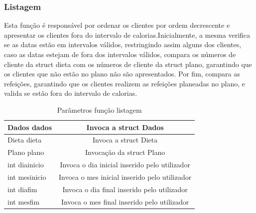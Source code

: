 \documentclass[a4wide]{report}
\begin{document}
\subsubsection{Listagem }
Esta função é responsável por ordenar os clientes por ordem decrescente e apresentar os clientes fora do intervalo de calorias.Inicialmente, a mesma verifica se as datas estão em intervalos válidos, restringindo assim alguns dos clientes, caso as datas estejam de fora dos intervalos válidos, compara os números de cliente da struct dieta com os números de cliente da struct plano, garantindo que os clientes que não estão no plano não são apresentados. Por fim, compara as refeições, garantindo que os clientes realizem as refeições planeadas no plano, e valida se estão fora do intervalo de calorias.
\begin{table}[h]
    \centering
       \caption{Parâmetros função listagem} 
    \begin{tabular}{|l|c|}\hline
         Dados dados&Invoca a struct Dados\\ \hline 
         Dieta dieta&Invoca a struct Dieta\\ \hline 
            Plano plano&Invocação da struct Plano\\\hline
         int diainicio& Invoca o dia inicial inserido pelo utilizador\\ \hline  
         int mesinicio& Invoca o mes inicial inserido pelo utilizador\\ \hline  
         int diafim& Invoca o dia final inserido pelo utilizador\\ \hline  
         int mesfim&  Invoca o mes final inserido pelo utilizador\\ \hline 
    \end{tabular} 
\end{table}
\end{document}
